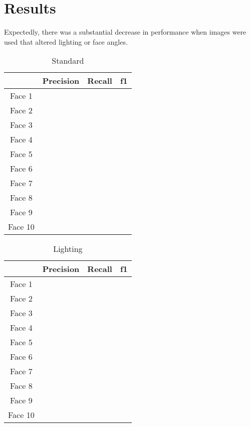 \documentclass[letterpaper]{article}
\begin{document}
\section{Results}
Expectedly, there was a substantial decrease in performance when images were used that altered lighting or face angles.
\begin{table}
\caption{Standard}
\begin{center}
\label{standard}
\begin {tabular} {|c|c|c|c|}
\hline
& \textrm{Precision} & \textrm{Recall} & \textrm{f1}\\
\hline
Face 1 &  &  &  \\
\hline
Face 2 &  &  &  \\
\hline
Face 3 &  &  &  \\
\hline
Face 4 &  &  &  \\
\hline
Face 5 &  &  &  \\
\hline
Face 6 &  &  &  \\
\hline
Face 7 &  &  &  \\
\hline
Face 8 &  &  &  \\
\hline
Face 9 &  &  &  \\
\hline
Face 10 &  &  &  \\
\hline
\end {tabular}
\end{center}
\end{table}
\begin{table}
\caption{Lighting}
\begin{center}
\label{lighting}
\begin {tabular} {|c|c|c|c|}
\hline
& \textrm{Precision} & \textrm{Recall} & \textrm{f1}\\
\hline
Face 1 &  &  &  \\
\hline
Face 2 &  &  &  \\
\hline
Face 3 &  &  &  \\
\hline
Face 4 &  &  &  \\
\hline
Face 5 &  &  &  \\
\hline
Face 6 &  &  &  \\
\hline
Face 7 &  &  &  \\
\hline
Face 8 &  &  &  \\
\hline
Face 9 &  &  &  \\
\hline
Face 10 &  &  &  \\
\hline
\end {tabular}
\end{center}
\end{table}
\end{document}
